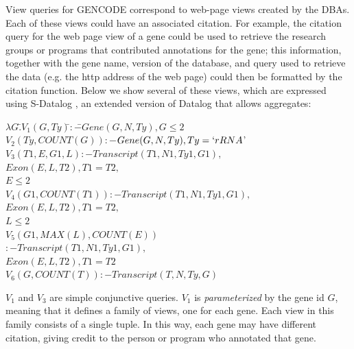 View queries for GENCODE correspond to web-page views  created by the DBAs.  Each of these views could have an associated citation.  For example, the citation query for the web page view of a gene could be used to retrieve the research groups or programs that contributed annotations for the gene; this information, together with the gene name, version of the database, and query used to retrieve the data (e.g. the http address of the web page) could then be formatted by the citation function.
Below we show several of these views, which are expressed using S-Datalog \cite{consens1990low}, an extended version of Datalog that allows aggregates:
\noindent
\begin{tabbing}
$\lambda G.$\=$V_1(G, Ty) $\hspace{6em}\=$:-$\=$ Gene(G, N, Ty), G \leq 2$\\
\> $V_2(Ty, COUNT(G)) $\>$:-$\>$ Gene(G, N, Ty), Ty = `rRNA$'\\
\> $V_3(T1, E, G1, L)$\>$:-$\>$Transcript(T1, N1, Ty1, G1),$\\
\>\>\>$Exon(E, L, T2), T1 = T2,$\\
\>\>\>$E \leq 2$\\
\> $V_4(G1, COUNT(T1))$\>$:-$\>$Transcript(T1, N1, Ty1, G1),$\\
\>\>\>$Exon(E, L, T2), T1 = T2, $\\
\>\>\>$L \leq 2$\\
\>$V_5(G1, MAX(L), COUNT(E))$\\
\>\>$:-$\>$Transcript(T1, N1, Ty1, G1),$\\
\>\>\>$Exon(E, L, T2), T1 = T2$\\
\> $V_6(G, COUNT(T)) $\>$:-$\>$ Transcript(T, N, Ty, G)$
\end{tabbing}
$V_1$ and $V_3$ are simple conjunctive queries. %
$V_1$ is \textit{parameterized} by the gene id $G$, meaning that it defines a family of views, one for each gene. Each view in this family consists of a single tuple.  In this way, each gene may have different citation, giving credit to the person or program who annotated that gene. 
